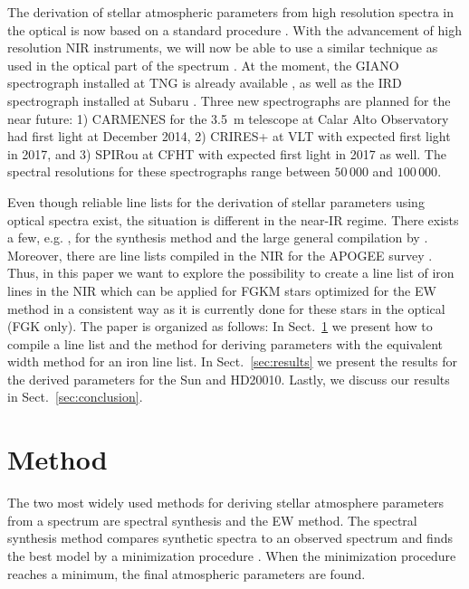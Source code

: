 \documentclass{aa}
\begin{document}
The derivation of stellar atmospheric parameters from high
resolution spectra in the optical is now based on a standard
procedure \citep[see e.g.][]{Valenti2005,Sousa2008a}. With the
advancement of high resolution NIR instruments, we will now be able to use a similar
technique as used in the optical part of the spectrum
\citep[see e.g.][]{Melendez1999,Sousa2008a,Tsantaki2013,Mucciarelli2013,Bensby2014}.
At the moment, the GIANO spectrograph installed at TNG is already
available \citep{GIANO}, as well as the IRD spectrograph installed
at Subaru \citep{IRD}. Three new spectrographs are planned for the
near future: 1) CARMENES for the \SI{3.5}{m} telescope at Calar Alto
Observatory \citep{CARMENES} had first light at December 2014,
2) CRIRES+ at VLT \citep{CRIRESp} with expected first light in 2017,
and 3) SPIRou at CFHT \citep{SPIROU1,SPIROU2} with expected first light
in 2017 as well. The spectral resolutions for these spectrographs range
between $50\,000$ and $100\,000$.

Even though reliable line lists for the derivation of stellar parameters
using optical spectra exist, the situation is different in the near-IR
regime. There exists a few, e.g. \citet{Onehag2012,Origlia2013,Rhodin2015},
for the synthesis method and the large general compilation by
\citet{Melendez1999}. Moreover, there are line lists compiled
in the NIR for the APOGEE survey \citep[see e.g.][]{Smith2013,Shetrone2015}.
Thus, in this paper we want to explore the
possibility to create a line list of iron lines in the NIR which can
be applied for FGKM stars optimized for the EW method in a consistent
way as it is currently done for these stars in the optical (FGK
only). The paper is organized as follows: In Sect.~\ref{sec:method}
we present how to compile a line list and the method for deriving
parameters with the equivalent width method for an iron line list.
In Sect.~\ref{sec:results} we present the results for the derived
parameters for the Sun and HD20010. Lastly, we discuss our results in
Sect.~\ref{sec:conclusion}.


\section{Method}
\label{sec:method}

The two most widely used methods for deriving stellar atmosphere
parameters from a spectrum are spectral synthesis and the EW method.
The spectral synthesis method compares synthetic spectra to an observed
spectrum and finds the best model by a minimization procedure
\citep[see e.g.][]{Valenti2005,Onehag2012,Blanco2014}. When the minimization
procedure reaches a minimum, the final atmospheric parameters are found.
\end{document}
